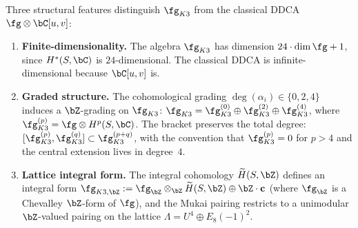 Three structural features distinguish $\fg_{K3}$ from the classical DDCA
$\fg \otimes \bC[u,v]$:

\begin{enumerate}[label=(\roman*)]
\item \textbf{Finite-dimensionality.}
 The algebra $\fg_{K3}$ has dimension $24 \cdot \dim\fg + 1$, since
 $H^*(S,\bC)$ is $24$-dimensional. The classical DDCA is
 infinite-dimensional because $\bC[u,v]$ is.

\item \textbf{Graded structure.}
 The cohomological grading $\deg(\alpha_i) \in \{0, 2, 4\}$ induces a
 $\bZ$-grading on $\fg_{K3}$:
 $\fg_{K3} = \fg_{K3}^{(0)} \oplus \fg_{K3}^{(2)} \oplus \fg_{K3}^{(4)}$,
 where $\fg_{K3}^{(p)} = \fg \otimes H^p(S, \bC)$.
 The bracket preserves the total degree:
 $[\fg_{K3}^{(p)}, \fg_{K3}^{(q)}] \subset \fg_{K3}^{(p+q)}$,
 with the convention that $\fg_{K3}^{(p)} = 0$ for $p > 4$ and the
 central extension lives in degree~$4$.

\item \textbf{Lattice integral form.}
 The integral cohomology $\widetilde{H}(S, \bZ)$ defines an integral
 form $\fg_{K3,\bZ} := \fg_\bZ \otimes_\bZ \widetilde{H}(S, \bZ) \oplus \bZ \cdot \mathbf{c}$
 (where $\fg_\bZ$ is a Chevalley $\bZ$-form of $\fg$), and the Mukai
 pairing restricts to a unimodular $\bZ$-valued pairing on the lattice
 $\Lambda = U^4 \oplus E_8(-1)^2$.
\end{enumerate}

